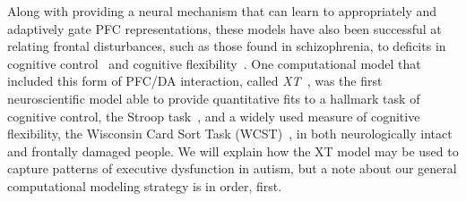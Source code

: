 Along with providing a neural mechanism that can learn to appropriately and adaptively gate PFC representations, these models have also been successful at relating frontal disturbances, such as those found in schizophrenia, to deficits in cognitive control~\cite{CohenJD:1992:Schizophrenia} and cognitive flexibility~\cite{BraverTS:1999:Schizophrenia}. One computational model that included this form of PFC/DA interaction, called \emph{XT}~\cite{RougierNP:2005:XT}, was the first neuroscientific model able to provide quantitative fits to a hallmark task of cognitive control, the Stroop task~\cite{StroopJR:1935:Interference}, and a widely used measure of cognitive flexibility, the Wisconsin Card Sort Task (WCST)~\cite{BergEA:1948:WCST}, in both neurologically intact and frontally damaged people. We will explain how the XT model may be used to capture patterns of executive dysfunction in autism, but a note about our general computational modeling strategy is in order, first.
